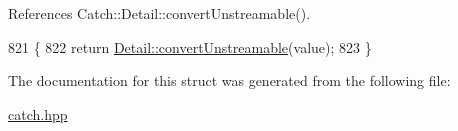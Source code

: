 References Catch\-::\-Detail\-::convert\-Unstreamable().


\begin{DoxyCode}
821                                        \{
822             \textcolor{keywordflow}{return} \hyperlink{namespace_catch_1_1_detail_accc3d481dbb5356a8c2c04338b511ee1}{Detail::convertUnstreamable}(value);
823         \}
\end{DoxyCode}


The documentation for this struct was generated from the following file\-:\begin{DoxyCompactItemize}
\item 
\hyperlink{catch_8hpp}{catch.\-hpp}\end{DoxyCompactItemize}
